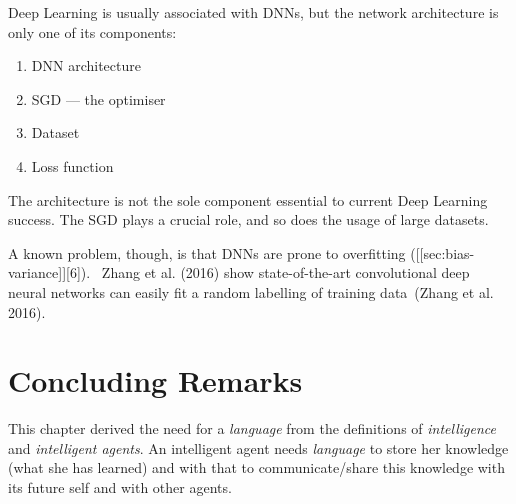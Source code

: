 \documentclass[
  letterpaper,
  12pt,
  british]{tufte-book}
\theoremstyle{plain}
\theoremstyle{plain}
\theoremstyle{definition}
\theoremstyle{remark}
\begin{document}
Deep Learning is usually associated with {DNNs}, but the network
architecture is only one of its components:

\begin{enumerate}
\def\labelenumi{\arabic{enumi}.}
\item
  DNN architecture
\item
  {SGD} --- the optimiser
\item
  Dataset
\item
  Loss function
\end{enumerate}

The architecture is not the sole component essential to current Deep
Learning success. The {SGD} plays a crucial role, and so does the usage
of large datasets.

A known problem, though, is that DNNs are prone to overfitting
({[}{[}sec:bias-variance{]}{]}{[}6{]}). ~Zhang et al.
(2016)
show state-of-the-art convolutional deep neural networks can easily fit
a random labelling of training data~(Zhang et al.
2016).

\hypertarget{concluding-remarks}{%
\section{Concluding Remarks}\label{concluding-remarks}}

This chapter derived the need for a \emph{language} from the definitions
of \emph{intelligence} and \emph{intelligent agents}. An intelligent
agent needs \emph{language} to store her knowledge (what she has
learned) and with that to communicate/share this knowledge with its
future self and with other agents.
\end{document}
